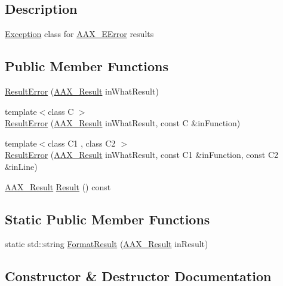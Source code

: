 \subsection{Description}
\mbox{\hyperlink{a00853}{Exception}} class for \mbox{\hyperlink{a00494_a5f8c7439f3a706c4f8315a9609811937}{A\+A\+X\+\_\+\+E\+Error}} results \subsection*{Public Member Functions}
\begin{DoxyCompactItemize}
\item 
\mbox{\hyperlink{a01597_ad96a8e3b025441353ffd2eb4f25f9126}{Result\+Error}} (\mbox{\hyperlink{a00392_a4d8f69a697df7f70c3a8e9b8ee130d2f}{A\+A\+X\+\_\+\+Result}} in\+What\+Result)
\item 
{\footnotesize template$<$class C $>$ }\\\mbox{\hyperlink{a01597_adb645fa763b880387217fda5fb08e9ce}{Result\+Error}} (\mbox{\hyperlink{a00392_a4d8f69a697df7f70c3a8e9b8ee130d2f}{A\+A\+X\+\_\+\+Result}} in\+What\+Result, const C \&in\+Function)
\item 
{\footnotesize template$<$class C1 , class C2 $>$ }\\\mbox{\hyperlink{a01597_a512d5c7f7c7fdea31d86ef0696768a37}{Result\+Error}} (\mbox{\hyperlink{a00392_a4d8f69a697df7f70c3a8e9b8ee130d2f}{A\+A\+X\+\_\+\+Result}} in\+What\+Result, const C1 \&in\+Function, const C2 \&in\+Line)
\item 
\mbox{\hyperlink{a00392_a4d8f69a697df7f70c3a8e9b8ee130d2f}{A\+A\+X\+\_\+\+Result}} \mbox{\hyperlink{a01597_ad7773300e7e3920726ad6ffe508d3547}{Result}} () const
\end{DoxyCompactItemize}
\subsection*{Static Public Member Functions}
\begin{DoxyCompactItemize}
\item 
static std\+::string \mbox{\hyperlink{a01597_a55c2ce6a7122bee29558dc16bd860067}{Format\+Result}} (\mbox{\hyperlink{a00392_a4d8f69a697df7f70c3a8e9b8ee130d2f}{A\+A\+X\+\_\+\+Result}} in\+Result)
\end{DoxyCompactItemize}


\subsection{Constructor \& Destructor Documentation}
\mbox{\label{a01597_ad96a8e3b025441353ffd2eb4f25f9126}} 
